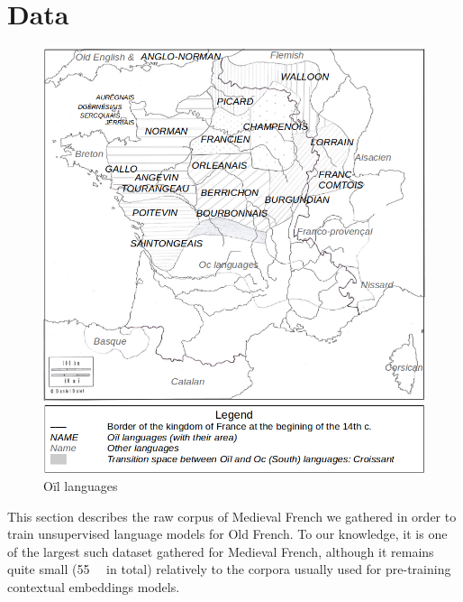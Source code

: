
\section{Data}\label{sec-data}

\begin{figure}[thb]
    \centering
    \includegraphics[scale=0.29]{static/media/models/bertrade/map-dialects2.png}
    \caption{Oïl languages}
    \label{fig:map-dialects}
\end{figure}

This section describes the raw corpus of Medieval French we gathered in order to train unsupervised language models for Old French.
To our knowledge, it is one of the largest such dataset gathered for Medieval French, although it remains quite small (\SI{55}{\mebi\byte} in total) relatively to the corpora usually used for pre-training contextual embeddings models.

